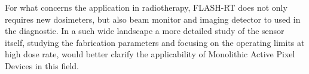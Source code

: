 For what concerns the application in radiotherapy, FLASH-RT does not only requires new dosimeters, but also beam monitor and imaging detector to used in the diagnostic. In a such wide landscape a more detailed study of the sensor itself, studying the fabrication parameters and focusing on the operating limits at high dose rate, would better clarify the applicability of Monolithic Active Pixel Devices in this field.



